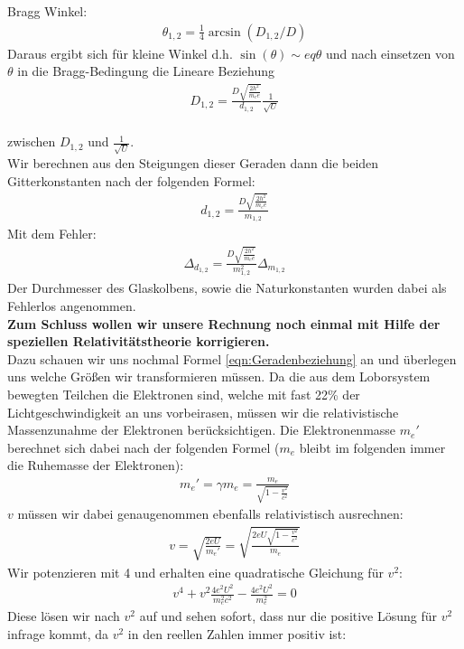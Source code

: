 \documentclass[12pt,a4paper]{article}
\begin{document}
Bragg Winkel:
\begin{align}
\theta_{1,2} = \frac{1}{4}\arcsin(D_{1,2}/D)
\end{align}
Daraus ergibt sich für kleine Winkel d.h. $\sin(\theta) \sim   eq \theta$ und nach einsetzen von $\theta$ in die Bragg-Bedingung die Lineare Beziehung
\begin{align}
D_{1,2} = \frac{D\sqrt{\frac{2h^2}{m_ee}}}{d_{1,2}}\frac{1}{\sqrt{U}}
\label{eqn:Geradenbeziehung}
\end{align}\\
zwischen $D_{1,2}$ und $\frac{1}{\sqrt{U}}$.\\
Wir berechnen aus den Steigungen dieser Geraden dann die beiden Gitterkonstanten nach der folgenden Formel:
\begin{align}
d_{1,2} = \frac{D\sqrt{\frac{2h^2}{m_ee}}}{m_{1,2}}
\label{eqn:d}
\end{align}
Mit dem Fehler:
\begin{align}
\Delta_{d_{1,2}} = \frac{D\sqrt{\frac{2h^2}{m_ee}}}{m_{1,2}^2}\Delta_{m_{1,2}}
\label{eqn:d_delta}
\end{align}
Der Durchmesser des Glaskolbens, sowie die Naturkonstanten wurden dabei als Fehlerlos angenommen.\\
\textbf{Zum Schluss wollen wir unsere Rechnung noch einmal mit Hilfe der speziellen Relativitätstheorie korrigieren.}\\
Dazu schauen wir uns nochmal Formel \ref{eqn:Geradenbeziehung} an und überlegen uns welche Größen wir transformieren müssen. Da die aus dem Loborsystem bewegten Teilchen die Elektronen sind, welche mit fast 22\% der Lichtgeschwindigkeit an uns vorbeirasen, müssen wir die relativistische Massenzunahme der Elektronen berücksichtigen.
Die Elektronenmasse $m_e'$ berechnet sich dabei nach der folgenden Formel ($m_e$ bleibt im folgenden immer die Ruhemasse der Elektronen):
\begin{align}
m_e' = \gamma m_e = \frac{m_e}{\sqrt{1-\frac{v^2}{c^2}}}
\end{align}
$v$ müssen wir dabei genaugenommen ebenfalls relativistisch ausrechnen:
\begin{align}
v = \sqrt{\frac{2eU}{m_e'}} = \sqrt{\frac{2eU\sqrt{1-\frac{v^2}{c^2}}}{m_e}}
\end{align}
Wir potenzieren mit 4 und erhalten eine quadratische Gleichung für $v^2$:
\begin{align}
v^4 + v^2\frac{4 e^2 U^2}{m_e^2 c^2} - \frac{4 e^2 U^2}{m_e^2} = 0
\end{align}
Diese lösen wir nach $v^2$ auf und sehen sofort, dass nur die positive Lösung für $v^2$ infrage kommt, da $v^2$ in den reellen Zahlen immer positiv ist:
\end{document}
